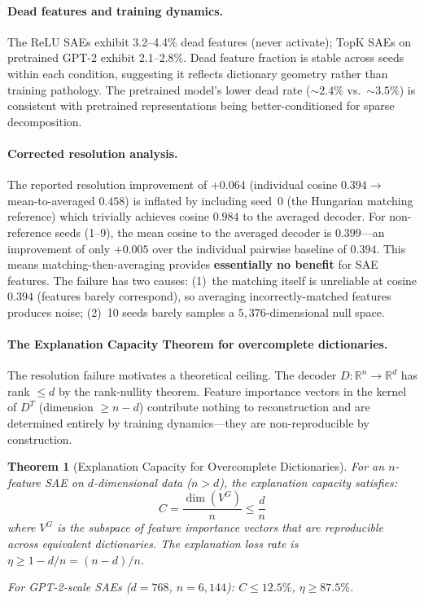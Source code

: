 \documentclass{article}
\newtheorem{theorem}{Theorem}
\begin{document}
\paragraph{Dead features and training dynamics.}
The ReLU SAEs exhibit 3.2--4.4\% dead features (never activate); TopK SAEs on pretrained GPT-2 exhibit 2.1--2.8\%. Dead feature fraction is stable across seeds within each condition, suggesting it reflects dictionary geometry rather than training pathology. The pretrained model's lower dead rate (${\sim}2.4\%$ vs.\ ${\sim}3.5\%$) is consistent with pretrained representations being better-conditioned for sparse decomposition.

\paragraph{Corrected resolution analysis.}
The reported resolution improvement of $+0.064$ (individual cosine $0.394 \to$ mean-to-averaged $0.458$) is inflated by including seed~0 (the Hungarian matching reference) which trivially achieves cosine $0.984$ to the averaged decoder. For non-reference seeds (1--9), the mean cosine to the averaged decoder is $0.399$---an improvement of only $+0.005$ over the individual pairwise baseline of $0.394$. This means matching-then-averaging provides \textbf{essentially no benefit} for SAE features. The failure has two causes: (1)~the matching itself is unreliable at cosine $0.394$ (features barely correspond), so averaging incorrectly-matched features produces noise; (2)~10 seeds barely samples a $5{,}376$-dimensional null space.

\paragraph{The Explanation Capacity Theorem for overcomplete dictionaries.}
The resolution failure motivates a theoretical ceiling. The decoder $D : \mathbb{R}^n \to \mathbb{R}^d$ has rank $\leq d$ by the rank-nullity theorem. Feature importance vectors in the kernel of $D^T$ (dimension $\geq n - d$) contribute nothing to reconstruction and are determined entirely by training dynamics---they are non-reproducible by construction.

\begin{theorem}[Explanation Capacity for Overcomplete Dictionaries]\label{thm:sae-capacity}
For an $n$-feature SAE on $d$-dimensional data ($n > d$), the explanation capacity satisfies:
$$C = \frac{\dim(V^G)}{n} \leq \frac{d}{n}$$
where $V^G$ is the subspace of feature importance vectors that are reproducible across equivalent dictionaries. The explanation loss rate is $\eta \geq 1 - d/n = (n-d)/n$.

For GPT-2-scale SAEs ($d = 768$, $n = 6{,}144$): $C \leq 12.5\%$, $\eta \geq 87.5\%$.
\end{theorem}
\end{document}
